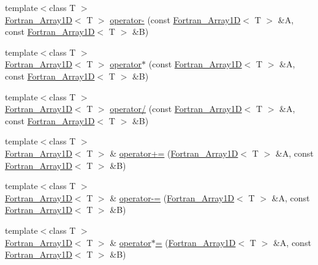 \begin{DoxyCompactItemize}
{\footnotesize template$<$class T $>$ }\\\hyperlink{classTNT_1_1Fortran__Array1D}{Fortran\-\_\-\-Array1\-D}$<$ T $>$ \hyperlink{namespaceTNT_ad7331d30236d9f5abbcf950c8099ff41}{operator-\/} (const \hyperlink{classTNT_1_1Fortran__Array1D}{Fortran\-\_\-\-Array1\-D}$<$ T $>$ \&A, const \hyperlink{classTNT_1_1Fortran__Array1D}{Fortran\-\_\-\-Array1\-D}$<$ T $>$ \&B)
\item 
{\footnotesize template$<$class T $>$ }\\\hyperlink{classTNT_1_1Fortran__Array1D}{Fortran\-\_\-\-Array1\-D}$<$ T $>$ \hyperlink{namespaceTNT_a1708060b60e700f693045a1a3fd036dc}{operator$\ast$} (const \hyperlink{classTNT_1_1Fortran__Array1D}{Fortran\-\_\-\-Array1\-D}$<$ T $>$ \&A, const \hyperlink{classTNT_1_1Fortran__Array1D}{Fortran\-\_\-\-Array1\-D}$<$ T $>$ \&B)
\item 
{\footnotesize template$<$class T $>$ }\\\hyperlink{classTNT_1_1Fortran__Array1D}{Fortran\-\_\-\-Array1\-D}$<$ T $>$ \hyperlink{namespaceTNT_a6c22c7c6cb47711936fa5f6908eef3d0}{operator/} (const \hyperlink{classTNT_1_1Fortran__Array1D}{Fortran\-\_\-\-Array1\-D}$<$ T $>$ \&A, const \hyperlink{classTNT_1_1Fortran__Array1D}{Fortran\-\_\-\-Array1\-D}$<$ T $>$ \&B)
\item 
{\footnotesize template$<$class T $>$ }\\\hyperlink{classTNT_1_1Fortran__Array1D}{Fortran\-\_\-\-Array1\-D}$<$ T $>$ \& \hyperlink{namespaceTNT_a253797dd42bff9c8ccecefde89285dd5}{operator+=} (\hyperlink{classTNT_1_1Fortran__Array1D}{Fortran\-\_\-\-Array1\-D}$<$ T $>$ \&A, const \hyperlink{classTNT_1_1Fortran__Array1D}{Fortran\-\_\-\-Array1\-D}$<$ T $>$ \&B)
\item 
{\footnotesize template$<$class T $>$ }\\\hyperlink{classTNT_1_1Fortran__Array1D}{Fortran\-\_\-\-Array1\-D}$<$ T $>$ \& \hyperlink{namespaceTNT_abe37526eed91699f99cf3b60ea4354b8}{operator-\/=} (\hyperlink{classTNT_1_1Fortran__Array1D}{Fortran\-\_\-\-Array1\-D}$<$ T $>$ \&A, const \hyperlink{classTNT_1_1Fortran__Array1D}{Fortran\-\_\-\-Array1\-D}$<$ T $>$ \&B)
\item 
{\footnotesize template$<$class T $>$ }\\\hyperlink{classTNT_1_1Fortran__Array1D}{Fortran\-\_\-\-Array1\-D}$<$ T $>$ \& \hyperlink{namespaceTNT_a3215ccc5d133fc66f71fc63d65424e91}{operator$\ast$=} (\hyperlink{classTNT_1_1Fortran__Array1D}{Fortran\-\_\-\-Array1\-D}$<$ T $>$ \&A, const \hyperlink{classTNT_1_1Fortran__Array1D}{Fortran\-\_\-\-Array1\-D}$<$ T $>$ \&B)

\end{DoxyCompactItemize}
